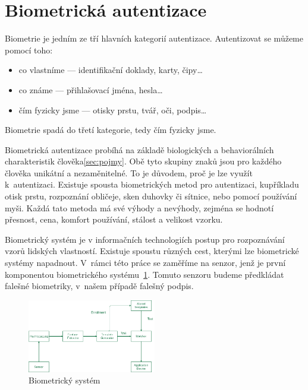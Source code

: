 \section{Biometrická autentizace}
Biometrie je jedním ze tří hlavních kategorií autentizace.
Autentizovat se můžeme pomocí toho:

\begin{itemize}
  \item co vlastníme --- identifikační doklady, karty, čipy\ldots   %
  \item co známe --- přihlašovací jména, hesla\ldots                %
  \item čím fyzicky jsme --- otisky prstu, tvář, oči, podpis\ldots~\cite{RakRoman2008}%
\end{itemize}                                                   %
Biometrie spadá do třetí kategorie, tedy čím fyzicky jsme. 
\newline

Biometrická autentizace probíhá na základě biologických a behaviorálních charakteristik člověka\ref{sec:pojmy}. 
Obě tyto skupiny znaků jsou pro každého člověka unikátní a nezaměnitelné. To je důvodem, proč je lze využít k~autentizaci.
Existuje spousta biometrických metod pro autentizaci, kupříkladu otisk prstu, rozpoznání obličeje, sken duhovky či sítnice, nebo pomocí používání myši. 
Každá tato metoda má své výhody a nevýhody, zejména se hodnotí přesnost, cena, komfort používání, stálost a velikost vzorku. %

Biometrický systém je v informačních technologiích postup pro rozpoznávání vzorů lidských vlastností.       %
Existuje spoustu různých cest, kterými lze biometrické systémy napadnout.                                   %
V~rámci této práce se zaměříme na senzor, jenž je první komponentou biometrického systému~\ref{fig:biometricky_system}.%
Tomuto senzoru budeme předkládat falešné biometriky, v~našem případě falešný podpis.~\cite{DrahanskýMartin2011}%

\begin{figure}[h]
  \centering
  \includegraphics[width=0.5\textwidth]{obrazky-figures/biometricky_system.png}
  \caption{Biometrický systém~\cite{geeksforGeeks2022}}  %
  \label{fig:biometricky_system}
\end{figure}

